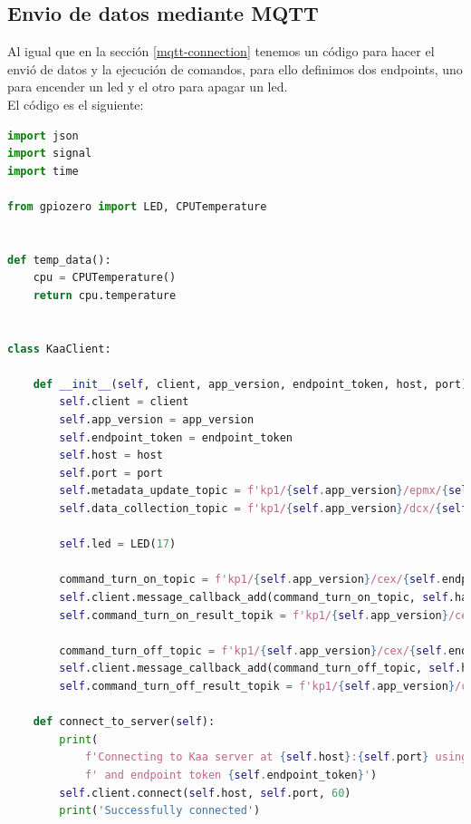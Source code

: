 {\subsection{Envio de datos mediante MQTT}

Al igual que en la sección \ref{mqtt-connection} tenemos un código para hacer el envió de datos y la ejecución de comandos, para ello definimos dos endpoints, uno para encender un led y el otro para apagar un led. \\


El código es el siguiente:

\begin{lstlisting}[language=Python]
import json
import signal
import time

from gpiozero import LED, CPUTemperature


def temp_data():
    cpu = CPUTemperature()
    return cpu.temperature


class KaaClient:

    def __init__(self, client, app_version, endpoint_token, host, port):
        self.client = client
        self.app_version = app_version
        self.endpoint_token = endpoint_token
        self.host = host
        self.port = port
        self.metadata_update_topic = f'kp1/{self.app_version}/epmx/{self.endpoint_token}/update/keys'
        self.data_collection_topic = f'kp1/{self.app_version}/dcx/{self.endpoint_token}/json'

        self.led = LED(17)

        command_turn_on_topic = f'kp1/{self.app_version}/cex/{self.endpoint_token}/command/turnon/status'
        self.client.message_callback_add(command_turn_on_topic, self.handle_turn_on_command)
        self.command_turn_on_result_topik = f'kp1/{self.app_version}/cex/{self.endpoint_token}/result/turnon'

        command_turn_off_topic = f'kp1/{self.app_version}/cex/{self.endpoint_token}/command/turnoff/status'
        self.client.message_callback_add(command_turn_off_topic, self.handle_turn_off_command)
        self.command_turn_off_result_topik = f'kp1/{self.app_version}/cex/{self.endpoint_token}/result/turnoff'

    def connect_to_server(self):
        print(
            f'Connecting to Kaa server at {self.host}:{self.port} using application version {self.app_version}'
            f' and endpoint token {self.endpoint_token}')
        self.client.connect(self.host, self.port, 60)
        print('Successfully connected')


\end{lstlisting}}
